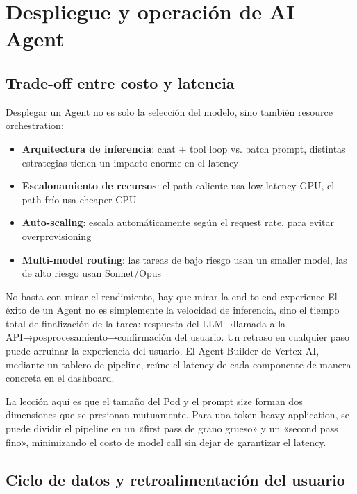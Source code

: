 \section{Despliegue y operación de AI Agent}

\subsection{Trade-off entre costo y latencia}

Desplegar un Agent no es solo la selección del modelo, sino también resource orchestration:

\begin{itemize}
    \item \textbf{Arquitectura de inferencia}: chat + tool loop vs. batch prompt, distintas estrategias tienen un impacto enorme en el latency
    \item \textbf{Escalonamiento de recursos}: el path caliente usa low-latency GPU, el path frío usa cheaper CPU
    \item \textbf{Auto-scaling}: escala automáticamente según el request rate, para evitar overprovisioning
    \item \textbf{Multi-model routing}: las tareas de bajo riesgo usan un smaller model, las de alto riesgo usan Sonnet/Opus
\end{itemize}

\begin{importantbox}{No basta con mirar el rendimiento, hay que mirar la end-to-end experience}
El éxito de un Agent no es simplemente la velocidad de inferencia, sino el tiempo total de finalización de la tarea: respuesta del LLM→llamada a la API→posprocesamiento→confirmación del usuario. Un retraso en cualquier paso puede arruinar la experiencia del usuario. El Agent Builder de Vertex AI, mediante un tablero de pipeline, reúne el latency de cada componente de manera concreta en el dashboard.
\end{importantbox}

La lección aquí es que el tamaño del Pod y el prompt size forman dos dimensiones que se presionan mutuamente. Para una token-heavy application, se puede dividir el pipeline en un «first pass de grano grueso» y un «second pass fino», minimizando el costo de model call sin dejar de garantizar el latency.

\subsection{Ciclo de datos y retroalimentación del usuario}

